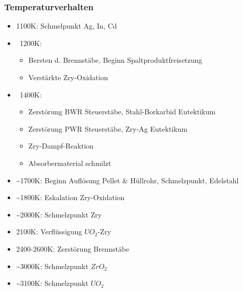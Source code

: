\documentclass[12pt]{article}
\begin{document}
\subsubsection{Temperaturverhalten}
\begin{itemize}
	\item 1100K: Schmelpunkt Ag, In, Cd
	\item ~1200K:
		\begin{itemize}
			\item Bersten d. Brennstäbe, Beginn Spaltproduktfreisetzung
			\item Verstärkte Zry-Oxidation
		\end{itemize}
	\item ~1400K:
		\begin{itemize}
			\item Zerstörung BWR Steuerstäbe, Stahl-Borkarbid Eutektikum
			\item Zerstörung PWR Steuerstäbe, Zry-Ag Eutektikum
			\item Zry-Dampf-Reaktion
			\item Absorbermaterial schmilzt
		\end{itemize}
	\item \textasciitilde 1700K: Beginn Auflösung Pellet \& Hüllrohr, Schmelzpunkt, Edelstahl
	\item \textasciitilde 1800K: Eskalation Zry-Oxidation
	\item \textasciitilde 2000K: Schmelzpunkt Zry
	\item 2100K: Verflüssigung \(UO_2\)-Zry
	\item 2400-2600K: Zerstörung Brennstäbe
	\item \textasciitilde 3000K: Schmelzpunkt \(ZrO_2\)
	\item \textasciitilde 3100K: Schmelzpunkt \(UO_2\)
\end{itemize}
\end{document}
